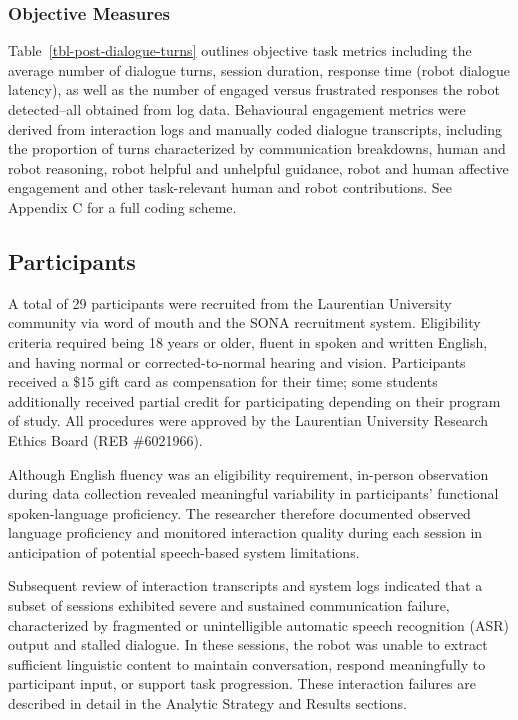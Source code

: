 \documentclass[
  letterpaper,
  DIV=11,
  numbers=noendperiod]{scrartcl}
\begin{document}
\subsubsection{Objective Measures}\label{objective-measures}

Table~\ref{tbl-post-dialogue-turns} outlines objective task metrics
including the average number of dialogue turns, session duration,
response time (robot dialogue latency), as well as the number of engaged
versus frustrated responses the robot detected--all obtained from log
data. Behavioural engagement metrics were derived from interaction logs
and manually coded dialogue transcripts, including the proportion of
turns characterized by communication breakdowns, human and robot
reasoning, robot helpful and unhelpful guidance, robot and human
affective engagement and other task-relevant human and robot
contributions. See Appendix C for a full coding scheme.

\subsection{Participants}\label{participants}

A total of 29 participants were recruited from the Laurentian University
community via word of mouth and the SONA recruitment system. Eligibility
criteria required being 18 years or older, fluent in spoken and written
English, and having normal or corrected-to-normal hearing and vision.
Participants received a \$15 gift card as compensation for their time;
some students additionally received partial credit for participating
depending on their program of study. All procedures were approved by the
Laurentian University Research Ethics Board (REB \#6021966).

Although English fluency was an eligibility requirement, in-person
observation during data collection revealed meaningful variability in
participants' functional spoken-language proficiency. The researcher
therefore documented observed language proficiency and monitored
interaction quality during each session in anticipation of potential
speech-based system limitations.

Subsequent review of interaction transcripts and system logs indicated
that a subset of sessions exhibited severe and sustained communication
failure, characterized by fragmented or unintelligible automatic speech
recognition (ASR) output and stalled dialogue. In these sessions, the
robot was unable to extract sufficient linguistic content to maintain
conversation, respond meaningfully to participant input, or support task
progression. These interaction failures are described in detail in the
Analytic Strategy and Results sections.
\end{document}
